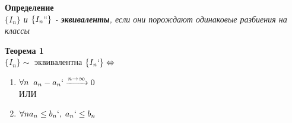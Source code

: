 \documentclass[12pt, a4paper]{article}
\begin{document}

\begin{tcolorbox}
\textbf{Определение}\\
\textit{$\{I_n\}$ и $\{I_n``\}$ - \textbf{эквиваленты}, если они порождают одинаковые разбиения на классы}
\end{tcolorbox}

\begin{tcolorbox}
\textbf{Теорема 1}\\
$\{ I_n \}\sim$ эквивалентна $\{ I_n` \} \Leftrightarrow$
\begin{enumerate}
    \item $\forall n \;\; a_n - a_n` \xrightarrow{n \to \infty} 0 $\\
    ИЛИ
    \item $\forall n a_n \leq b_n`,\; a_n` \leq b_n$
\end{enumerate}
\end{tcolorbox}
\end{document}

